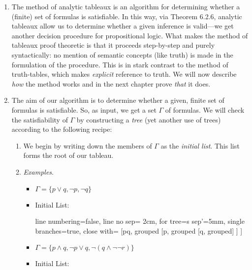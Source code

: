 	\begin{enumerate}[\thesection.1]

		\item The method of analytic tableaux is an algorithm for determining whether a (finite) set of formulas is satisfiable. In this way, via Theorem 6.2.6, analytic tableaux allow us to determine whether a given inference is valid---we get another decision procedure for propositional logic. What makes the method of tableaux proof theoretic is that it proceeds step-by-step and purely syntactically: no mention of semantic concepts (like truth) is made in the formulation of the procedure. This is in stark contrast to the method of truth-tables, which makes \emph{explicit} reference to truth. We will now describe \emph{how} the method works and in the next chapter prove \emph{that} it does.
		
		\item The aim of our algorithm is to determine whether a given, finite set of formulas is satisfiable. So, as input, we get a set $\Gamma$ of formulas. We will check the satisfiability of $\Gamma$ by constructing a \emph{tree} (yet another use of trees) according to the following recipe:
		
		\begin{enumerate}[1.]
		
			\item We begin by writing down the members of $\Gamma$ as the \emph{initial list}. This list forms the root of our tableau.
			
			\item[] \emph{Examples}.
			
			\begin{itemize}

				\item $\Gamma=\{p\lor q, \neg p, \neg q\}$

				\item[] Initial List: 

					\begin{prooftree}
						{
						line numbering=false,
						line no sep= 2cm,
						for tree={s sep'=5mm},
						single branches=true,
						close with=\xmark
						}
						[p\lor q, grouped [\neg p, grouped [\neg q, grouped] ] ]
					\end{prooftree}
					
				\item $\Gamma=\{p\land q, \neg p\lor q, \neg (q\land \neg \neg r)\}$

					\item[] Initial List:


\end{itemize}
\end{enumerate}
\end{enumerate}
